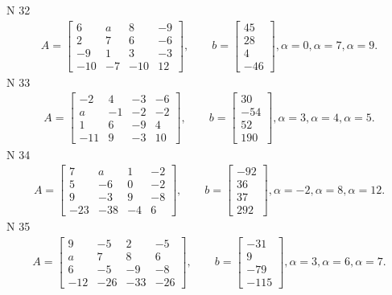\documentclass[11pt]{report}
\begin{document}
N 32
\begin{align*}
 A = \left[\begin{matrix}6 & a & 8 & -9\\2 & 7 & 6 & -6\\-9 & 1 & 3 & -3\\-10 & -7 & -10 & 12\end{matrix}\right],
    \qquad b = \left[\begin{matrix}45\\28\\4\\-46\end{matrix}\right], \alpha = 0, \alpha = 7, \alpha = 9. 
 \end{align*}
N 33
\begin{align*}
 A = \left[\begin{matrix}-2 & 4 & -3 & -6\\a & -1 & -2 & -2\\1 & 6 & -9 & 4\\-11 & 9 & -3 & 10\end{matrix}\right],
    \qquad b = \left[\begin{matrix}30\\-54\\52\\190\end{matrix}\right], \alpha = 3, \alpha = 4, \alpha = 5. 
 \end{align*}
N 34
\begin{align*}
 A = \left[\begin{matrix}7 & a & 1 & -2\\5 & -6 & 0 & -2\\9 & -3 & 9 & -8\\-23 & -38 & -4 & 6\end{matrix}\right],
    \qquad b = \left[\begin{matrix}-92\\36\\37\\292\end{matrix}\right], \alpha = -2, \alpha = 8, \alpha = 12. 
 \end{align*}
N 35
\begin{align*}
 A = \left[\begin{matrix}9 & -5 & 2 & -5\\a & 7 & 8 & 6\\6 & -5 & -9 & -8\\-12 & -26 & -33 & -26\end{matrix}\right],
    \qquad b = \left[\begin{matrix}-31\\9\\-79\\-115\end{matrix}\right], \alpha = 3, \alpha = 6, \alpha = 7. 
 \end{align*}
\end{document}
